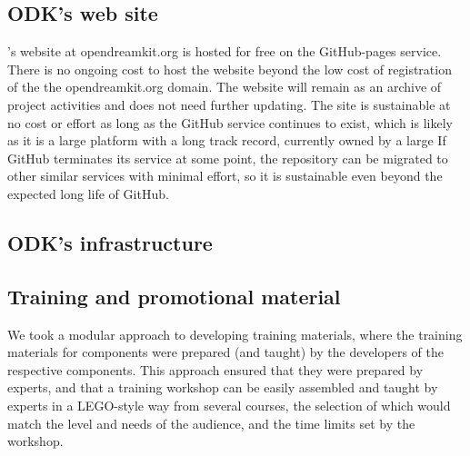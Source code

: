 \documentclass{deliverablereport}
\begin{document}
\subsection{ODK's web site}

\ODK's website at opendreamkit.org is hosted for free on the GitHub-pages service.
There is no ongoing cost to host the website beyond the low cost of registration of the the opendreamkit.org domain.
The \ODK website will remain as an archive of project activities and does not need further updating.
The site is sustainable at no cost or effort as long as the GitHub service continues to exist,
which is likely as it is a large platform with a long track record, currently owned by a large
If GitHub terminates its service at some point,
the repository can be migrated to other similar services with minimal effort,
so it is sustainable even beyond the expected long life of GitHub.


\subsection{ODK's infrastructure}


\subsection{Training and promotional material}


We took a modular approach to developing training materials,
where the training materials for \ODK components were prepared
(and taught) by the developers of the respective components. 
This approach ensured that they were prepared by experts, and 
that a training workshop can be easily assembled and taught by
experts in a LEGO-style way from several courses, the selection
of which would match the level and needs of the audience, and the 
time limits set by the workshop.
\end{document}
